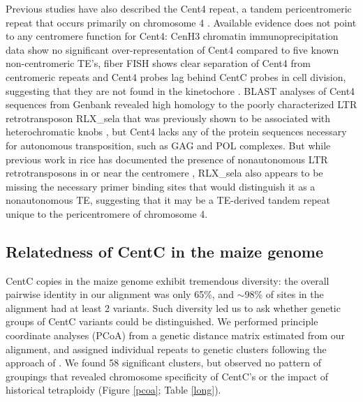 Previous studies have also described the Cent4 repeat, a tandem pericentromeric repeat that occurs primarily on chromosome 4 \citep{Page2001}. 
Available evidence does not point to any centromere function for Cent4: CenH3 chromatin immunoprecipitation data \citep{Wolfgruber2009, jin2004maize} show no significant over-representation of Cent4 compared to five known non-centromeric TE’s, fiber FISH shows clear separation of Cent4 from centromeric repeats \citep{jin2004maize} and Cent4 probes lag behind CentC probes in cell division, suggesting that they are not found in the kinetochore \citep{Jiang2002, jin2004maize}. 
BLAST analyses of Cent4 sequences from Genbank revealed high homology to the poorly characterized LTR retrotransposon RLX\_sela that was previously shown to be associated with heterochromatic  knobs \citep{Tenaillon2011, Chia2012}, but Cent4 lacks any of the protein sequences necessary for autonomous transposition, such as GAG and POL complexes.  
But while previous work in rice has documented the presence of nonautonomous LTR retrotransposons  in or near the centromere \citep{Jiang2002}, RLX\_sela also appears to be missing the necessary primer binding sites that would distinguish it as a nonautonomous TE, suggesting that it may be a TE-derived tandem repeat unique to the pericentromere of chromosome 4. 

\subsection*{Relatedness of CentC in the maize genome}

CentC copies in the maize genome exhibit tremendous diversity: the overall pairwise identity in our alignment was only 65\%, and $\sim$98\% of sites in the alignment had at least 2 variants.  
Such diversity led us to ask whether genetic groups of CentC variants could be distinguished. 
We performed principle coordinate analyses (PCoA) from a genetic distance matrix estimated from our alignment, and assigned individual repeats to  genetic clusters following the approach of \citet{Patterson2006}.  
We found 58 significant clusters, but observed no pattern of groupings that revealed chromosome specificity of CentC’s or the impact of historical tetraploidy (Figure \ref{pcoa}; Table \ref{long}).

